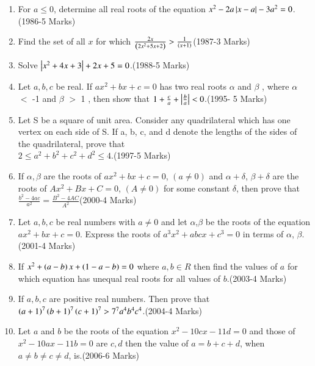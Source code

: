 \documentclass[journal,12pt,twocolumn]{IEEEtran}
\theoremstyle{remark}
\begin{document}
\begin{enumerate}[start=13]
 \item For $a \leq 0$, determine all real roots of the equation $x^2-2a\left\vert x-a\right\vert-3a^2=0$.\hfill{(1986-5 Marks)}
 \item Find the set of all $x$ for which $\frac{2x}{\left(2x^2+5x+2\right)}>\frac{1}{\left(x+1\right)}$\hfill{(1987-3 Marks)}
 \item Solve $\left\vert x^2+4x+3\right\vert+2x+5=0$.\hfill{(1988-5 Marks)}
 \item Let $a,b,c$ be real. If $ax^2+bx+c=0$ has two real roots $\alpha$ and $\beta$ , where $\alpha$ $<$ -1 and $\beta$ $>$ 1 , then show that $1+\frac{c}{a}+\left\vert\frac{b}{a}\right\vert<0$.\hfill{(1995- 5 Marks)}
 \item Let S be a square of unit area. Consider any quadrilateral which has one vertex on each side of S. If a, b, c, and d denote the lengths of the sides of the quadrilateral, prove that \\$2 \leq a^2+b^2+c^2+d^2 \leq 4$.\hfill{(1997-5 Marks)}
 \item If $\alpha,\beta$ are the roots of $ax^2+bx+c=0$, $(a\neq 0)$ and $\alpha+\delta$, $\beta+\delta$ are the roots of $Ax^2+Bx+C=0$, $(A\neq 0)$ for some constant $\delta$, then prove that $\frac{b^2-4ac}{a^2}=\frac{B^2-4AC}{A^2}$\hfill{(2000-4 Marks)}
 \item Let $a, b,c $ be real numbers with $a\neq0$ and let $\alpha$,$\beta$ be the roots of the equation $ax^2+bx+c=0$. Express the roots of $a^3x^2+abcx+c^3=0$ in terms of $\alpha$, $\beta$.\hfill{(2001-4 Marks)}
\item If $x^2+\left(a-b\right)x+\left(1-a-b\right)=0$ where $a, b\in R$ then find the values of $a$ for which equation has unequal real roots for all values of $b$.\hfill{(2003-4 Marks)}
\item If $a, b, c$ are positive real numbers. Then prove that $\left(a+1\right)^7\left(b+1\right)^7\left(c+1\right)^7 > 7^7a^4b^4c^4$.\hfill{(2004-4 Marks)}
\item Let $a$ and $b$ be the roots of the equation $x^2-10cx-11d=0$ and those of $x^2-10ax-11b=0$ are $c,d $ then the value of $a=b+c+d$, when $a\neq b\neq c\neq d$, is.\hfill{(2006-6 Marks)}


\end{enumerate}
\bigskip
\end{document}

